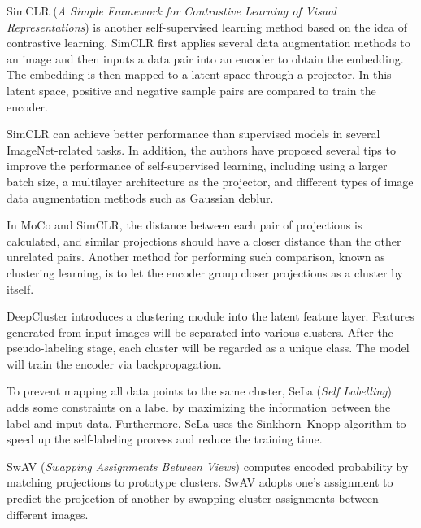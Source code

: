 
SimCLR (\textit{A Simple Framework for Contrastive Learning of Visual Representations}) \cite{SimCLR, chen2020big} is another self-supervised learning method based on the idea of contrastive learning. SimCLR first applies several data augmentation methods to an image and then inputs a data pair into an encoder to obtain the embedding. The embedding is then mapped to a latent space through a projector. In this latent space, positive and negative sample pairs are compared to train the encoder.


SimCLR can achieve better performance than supervised models in several ImageNet-related tasks. In addition, the authors have proposed several tips to improve the performance of self-supervised learning, including using a larger batch size, a multilayer architecture as the projector, and different types of image data augmentation methods such as Gaussian deblur. 

In MoCo and SimCLR, the distance between each pair of projections is calculated, and similar projections should have a closer distance than the other unrelated pairs. Another method for performing such comparison, known as clustering learning, is to let the encoder group closer projections as a cluster by itself.


DeepCluster \cite{DeepClustering} introduces a clustering module into the latent feature layer. Features generated from input images will be separated into various clusters. After the pseudo-labeling stage, each cluster will be regarded as a unique class. The model will train the encoder via backpropagation.



To prevent mapping all data points to the same cluster, SeLa (\textit{Self Labelling}) \cite{SeLa} adds some constraints on a label by maximizing the information between the label and input data. Furthermore, SeLa uses the Sinkhorn–Knopp algorithm to speed up the self-labeling process and reduce the training time.



SwAV (\textit{Swapping Assignments Between Views}) \cite{SwAV} computes encoded probability by matching projections to prototype clusters. SwAV adopts one's assignment to predict the projection of another by swapping cluster assignments between different images. 


